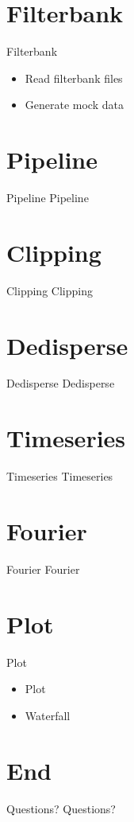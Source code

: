 \documentclass{beamer}
\begin{document}
\section{Filterbank}
\begin{frame}{Filterbank}
	\begin{itemize}
		\item Read filterbank files
		\item Generate mock data
	\end{itemize}
\end{frame}

\section{Pipeline}
\begin{frame}{Pipeline}
	Pipeline
\end{frame}

\section{Clipping}
\begin{frame}{Clipping}
	Clipping
\end{frame}

\section{Dedisperse}
\begin{frame}{Dedisperse}
	Dedisperse
\end{frame}

\section{Timeseries}
\begin{frame}{Timeseries}
	Timeseries
\end{frame}

\section{Fourier}
\begin{frame}{Fourier}
	Fourier
\end{frame}

\section{Plot}
\begin{frame}{Plot}
	\begin{itemize}
		\item Plot
		\item Waterfall
	\end{itemize}
\end{frame}

\section{End}
\begin{frame}{Questions?}
	Questions?
\end{frame}
\end{document}
